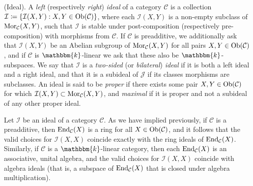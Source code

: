 \noindent\begin{definition}\textnormal{(Ideal).} A {\em left} (respectively {\em right}) {\em ideal} of a category $\mathcal{C}$ is a collection\linebreak $\mathcal{I} \coloneqq \{\mathcal{I}(X, Y) : X, Y \in \textnormal{Ob}(\mathcal{C})\}$, where each $\mathcal{I}(X, Y)$ is a non-empty subclass of $\textnormal{Mor}_\mathcal{C}(X, Y)$, such that $\mathcal{I}$ is stable under post-composition (respectively pre-composition) with morphisms from $\mathcal{C}$. If $\mathcal{C}$ is preadditive, we additionally ask that $\mathcal{I}(X, Y)$ be an Abelian subgroup of $\textnormal{Mor}_\mathcal{C}(X, Y)$ for all pairs $X, Y \in \textnormal{Ob}(\mathcal{C})$, and if $\mathcal{C}$ is $\mathbbm{k}$-linear we ask that these also be $\mathbbm{k}$-subspaces. We say that $\mathcal{I}$ is a {\em two-sided} (or {\em bilateral}) {\em ideal} if it is both a left ideal and a right ideal, and that it is a subideal of $\mathcal{J}$ if its classes morphisms are subclasses. An ideal is said to be {\em proper} if there exists some pair $X, Y \in \textnormal{Ob}(\mathcal{C})$ for which $\mathcal{I}(X, Y) \subset \textnormal{Mor}_\mathcal{C}(X, Y)$, and {\em maximal} if it is proper and not a subideal of any other proper ideal.\\
\end{definition}

\noindent Let $\mathcal{I}$ be an ideal of a category $\mathcal{C}$. As we have implied previously, if $\mathcal{C}$ is a preadditive, then $\textnormal{End}_\mathcal{C}(X)$ is a ring for all $X \in \textnormal{Ob}(\mathcal{C})$, and it follows that the valid choices for $\mathcal{I}(X, X)$ coincide exactly with the ring ideals of $\textnormal{End}_\mathcal{C}(X)$. Similarly, if $\mathcal{C}$ is a $\mathbbm{k}$-linear category, then each $\textnormal{End}_\mathcal{C}(X)$ is an associative, unital algebra, and the valid choices for $\mathcal{I}(X, X)$ coincide with algebra ideals (that is, a subspace of $\textnormal{End}_\mathcal{C}(X)$ that is closed under algebra multiplication).\\

